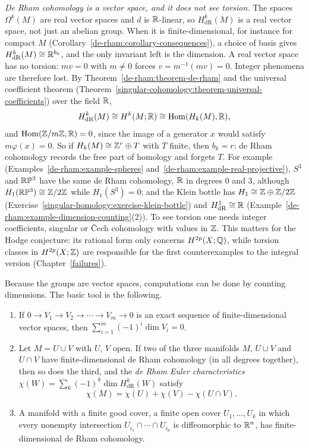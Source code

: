 \begin{remark}\label{de-rham:remark-no-torsion}
\emph{De Rham cohomology is a vector space, and it does not see torsion.} The spaces $\Omega^k(M)$ are real vector spaces and $d$ is $\mathbb{R}$-linear, so $H^k_{\mathrm{dR}}(M)$ is a real vector space, not just an abelian group.
When it is finite-dimensional, for instance for compact $M$ (Corollary~\ref{de-rham:corollary-consequences}), a choice of basis gives $H^k_{\mathrm{dR}}(M) \cong \mathbb{R}^{b_k}$, and the only invariant left is the dimension.
A real vector space has no torsion: $mv = 0$ with $m \neq 0$ forces $v = m^{-1}(mv) = 0$. Integer phenomena are therefore lost. By Theorem~\ref{de-rham:theorem-de-rham} and the universal coefficient theorem
(Theorem~\ref{singular-cohomology:theorem-universal-coefficients}) over the field $\mathbb{R}$,
\[
H^k_{\mathrm{dR}}(M) \cong H^k(M; \mathbb{R}) \cong \operatorname{Hom}(H_k(M), \mathbb{R}),
\]
and $\operatorname{Hom}(\mathbb{Z}/m\mathbb{Z}, \mathbb{R}) = 0$, since the image of a generator $x$ would satisfy $m\varphi(x) = 0$. So if $H_k(M) \cong \mathbb{Z}^{r} \oplus T$ with $T$ finite, then $b_k = r$: de Rham cohomology records the free part of homology and
forgets $T$. For example (Examples~\ref{de-rham:example-spheres} and~\ref{de-rham:example-real-projective}), $S^3$ and $\mathbb{R}\mathbb{P}^3$ have the same de Rham cohomology, $\mathbb{R}$ in degrees $0$ and $3$, although
$H_1(\mathbb{R}\mathbb{P}^3) \cong \mathbb{Z}/2\mathbb{Z}$ while $H_1(S^3) = 0$; and the Klein bottle has $H_1 \cong \mathbb{Z} \oplus \mathbb{Z}/2\mathbb{Z}$ (Exercise~\ref{singular-homology:exercise-klein-bottle}) and $H^1_{\mathrm{dR}} \cong \mathbb{R}$
(Example~\ref{de-rham:example-dimension-counting}(2)). To see torsion one needs integer coefficients, singular or \v{C}ech cohomology with values in $\mathbb{Z}$. This matters for the Hodge conjecture: its rational form only
concerns $H^{2p}(X; \mathbb{Q})$, while torsion classes in $H^{2p}(X; \mathbb{Z})$ are responsible for the first counterexamples to the integral version (Chapter~\ref{failures}).
\end{remark}

Because the groups are vector spaces, computations can be done by counting dimensions. The basic tool is the following.

\begin{proposition}\label{de-rham:proposition-dimension-counting}
\begin{enumerate}
\item If $0 \to V_1 \to V_2 \to \cdots \to V_m \to 0$ is an exact sequence of finite-dimensional vector spaces, then $\sum_{i=1}^m(-1)^i\dim V_i = 0$.
\item Let $M = U \cup V$ with $U$, $V$ open. If two of the three manifolds $M$, $U \sqcup V$ and $U \cap V$ have finite-dimensional de Rham cohomology (in all degrees together), then so does the third, and the
\emph{de Rham Euler characteristics} $\chi(W) = \sum_k(-1)^k\dim H^k_{\mathrm{dR}}(W)$ satisfy
\[
\chi(M) = \chi(U) + \chi(V) - \chi(U \cap V).
\]
\item A manifold with a finite good cover, a finite open cover $U_1, \ldots, U_k$ in which every nonempty intersection $U_{i_1} \cap \cdots \cap U_{i_p}$ is diffeomorphic to $\mathbb{R}^n$, has finite-dimensional de Rham
cohomology.
\end{enumerate}
\end{proposition}

